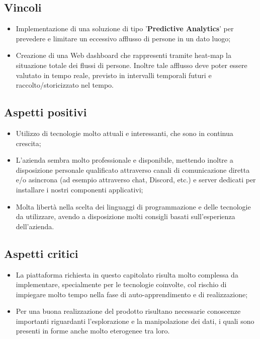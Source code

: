 \subsection{Vincoli}{
\begin{itemize}
\item Implementazione di una soluzione di tipo '\textbf{Predictive Analytics}' per prevedere e limitare un eccessivo afflusso di persone in un dato luogo; 
\item Creazione di una Web dashboard che rappresenti tramite heat-map la situazione totale dei flussi di persone. Inoltre tale afflusso deve poter essere valutato in tempo reale, previsto in intervalli temporali futuri e raccolto/storicizzato nel tempo.
\end{itemize}
}

\subsection{Aspetti positivi}{
\begin{itemize}
\item Utilizzo di tecnologie molto attuali e interessanti, che sono in continua crescita;
\item L'azienda sembra molto professionale e disponibile, mettendo inoltre a disposizione personale qualificato attraverso canali di comunicazione diretta e/o asincrona (ad esempio attraverso chat, Discord, etc.) e server dedicati per installare i nostri componenti applicativi;
\item Molta libertà nella scelta dei linguaggi di programmazione e delle tecnologie da utilizzare, avendo a disposizione molti consigli basati sull'esperienza dell'azienda.
\end{itemize}
}

\subsection{Aspetti critici}{
\begin{itemize}
\item La piattaforma richiesta in questo capitolato risulta molto complessa da implementare, specialmente per le tecnologie coinvolte, col rischio di impiegare molto tempo nella fase di auto-apprendimento e di realizzazione;
\item Per una buona realizzazione del prodotto risultano necessarie conoscenze importanti riguardanti l'esplorazione e la manipolazione dei dati, i quali sono presenti in forme anche molto eterogenee tra loro.
\end{itemize}
}

